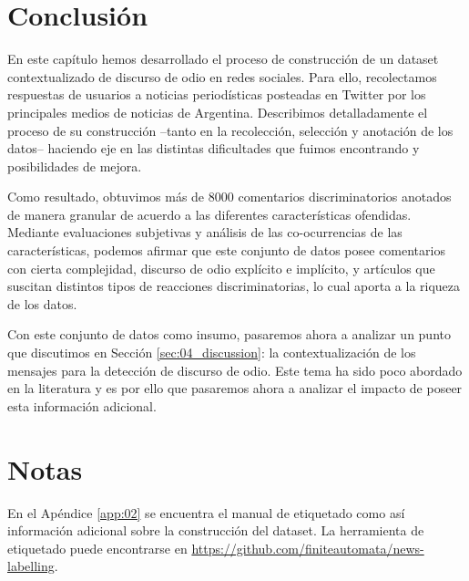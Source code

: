 \section{Conclusión}


En este capítulo hemos desarrollado el proceso de construcción de un dataset contextualizado de discurso de odio en redes sociales. Para ello, recolectamos respuestas de usuarios a noticias periodísticas posteadas en Twitter por los principales medios de noticias de Argentina. Describimos detalladamente el proceso de su construcción --tanto en la recolección, selección y anotación de los datos-- haciendo eje en las distintas dificultades que fuimos encontrando y posibilidades de mejora.

Como resultado, obtuvimos más de \num{8000} comentarios discriminatorios anotados de manera granular de acuerdo a las diferentes características ofendidas. Mediante evaluaciones subjetivas y análisis de las co-ocurrencias de las características, podemos afirmar que este conjunto de datos posee comentarios con cierta complejidad, discurso de odio explícito e implícito, y artículos que suscitan distintos tipos de reacciones discriminatorias, lo cual aporta a la riqueza de los datos.

Con este conjunto de datos como insumo, pasaremos ahora a analizar un punto que discutimos en Sección \ref{sec:04_discussion}: la contextualización de los mensajes para la detección de discurso de odio. Este tema ha sido poco abordado en la literatura y es por ello que pasaremos ahora a analizar el impacto de poseer esta información adicional.

\section{Notas}


En el Apéndice \ref{app:02} se encuentra el manual de etiquetado como así información adicional sobre la construcción del dataset. La herramienta de etiquetado puede encontrarse en \url{https://github.com/finiteautomata/news-labelling}.
